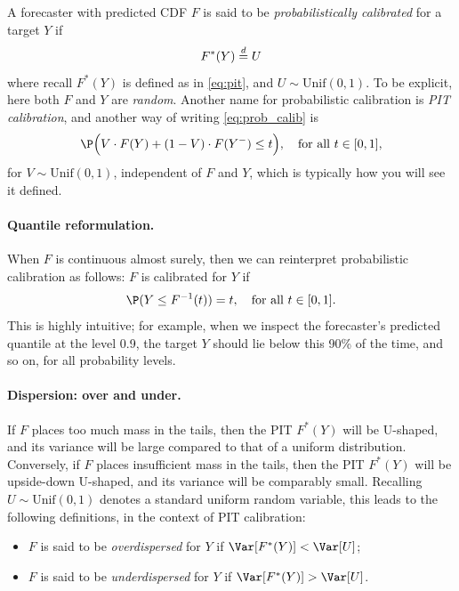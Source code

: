 \documentclass{article}
\begin{document}
A forecaster with predicted CDF $F$ is said to be \emph{probabilistically 
  calibrated} for a target $Y$ if 
\begin{equation}
\label{eq:prob_calib}
F^*(Y) \overset{d}{=} U
\end{equation}
where recall $F^*(Y)$ is defined as in \eqref{eq:pit}, and $U \sim 
\mathrm{Unif}(0,1)$. To be explicit, here both $F$ and $Y$ are
\emph{random}. Another name for probabilistic calibration is \emph{PIT
  calibration}, and another way of writing \eqref{eq:prob_calib} is  
\[
\P\Big( V \cdot F(Y) + (1-V) \cdot F(Y^-) \leq t \Big), \quad \text{for all $t
  \in [0,1]$}, 
\]
for $V \sim \mathrm{Unif}(0,1)$, independent of $F$ and $Y$, which is typically
how you will see it defined. 

\paragraph{Quantile reformulation.}

When $F$ is continuous almost surely, then we can reinterpret probabilistic
calibration as follows: $F$ is calibrated for $Y$ if   
\[
\P(Y \leq F^{-1}(t)) = t, \quad \text{for all $t \in [0,1]$}. 
\]
This is highly intuitive; for example, when we inspect the forecaster's
predicted quantile at the level 0.9, the target $Y$ should lie below this 90\% 
of the time, and so on, for all probability levels.   

\paragraph{Dispersion: over and under.}

If $F$ places too much mass in the tails, then the PIT $F^*(Y)$ will be
U-shaped, and its variance will be large compared to that of a uniform
distribution. Conversely, if $F$ places insufficient mass in the tails, then the 
PIT $F^*(Y)$ will be upside-down U-shaped, and its variance will be comparably
small. Recalling $U \sim \mathrm{Unif}(0,1)$ denotes a standard uniform random 
variable, this leads to the following definitions, in the context of PIT
calibration:   

\begin{itemize}
\item $F$ is said to be \emph{overdispersed} for $Y$ if $\Var[F^*(Y)] < \Var[U]$;
\item $F$ is said to be \emph{underdispersed} for $Y$ if $\Var[F^*(Y)] >
  \Var[U]$. 
\end{itemize}
\end{document}

